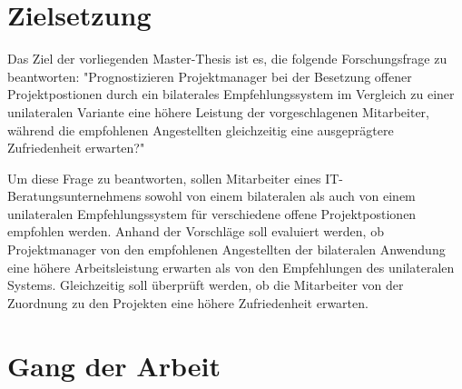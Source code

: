 \section{Zielsetzung}
\label{sec:intro:zielsetzung}
Das Ziel der vorliegenden Master-Thesis ist es, die folgende Forschungsfrage zu beantworten: "Prognostizieren Projektmanager bei der Besetzung offener Projektpostionen durch ein bilaterales Empfehlungssystem im Vergleich zu einer unilateralen Variante eine höhere Leistung der vorgeschlagenen Mitarbeiter, während die empfohlenen Angestellten gleichzeitig eine ausgeprägtere Zufriedenheit erwarten?"

Um diese Frage zu beantworten, sollen Mitarbeiter eines IT-Beratungsunternehmens sowohl von einem bilateralen als auch von einem unilateralen Empfehlungssystem für verschiedene offene Projektpostionen empfohlen werden. Anhand der Vorschläge soll evaluiert werden, ob Projektmanager von den empfohlenen Angestellten der bilateralen Anwendung eine höhere Arbeitsleistung erwarten als von den Empfehlungen des unilateralen Systems. Gleichzeitig soll überprüft werden, ob die Mitarbeiter von der Zuordnung zu den Projekten eine höhere Zufriedenheit erwarten.

\section{Gang der Arbeit}
\label{sec:intro:gangDerArbeit}

